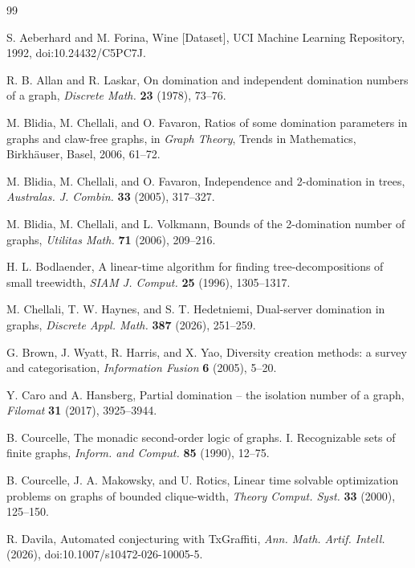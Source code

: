 \documentclass[11pt]{article}
\theoremstyle{definition}
\theoremstyle{remark}
\begin{document}
\begin{thebibliography}{99}

S. Aeberhard and M. Forina,
Wine [Dataset],
UCI Machine Learning Repository, 1992,
doi:10.24432/C5PC7J.

R. B. Allan and R. Laskar,
On domination and independent domination numbers of a graph,
\emph{Discrete Math.} \textbf{23} (1978), 73--76.

M. Blidia, M. Chellali, and O. Favaron,
Ratios of some domination parameters in graphs and claw-free graphs,
in \emph{Graph Theory}, Trends in Mathematics, Birkh\"auser, Basel, 2006,
61--72.

M. Blidia, M. Chellali, and O. Favaron,
Independence and 2-domination in trees,
\emph{Australas. J. Combin.} \textbf{33} (2005), 317--327.

M. Blidia, M. Chellali, and L. Volkmann,
Bounds of the 2-domination number of graphs,
\emph{Utilitas Math.} \textbf{71} (2006), 209--216.

H. L. Bodlaender,
A linear-time algorithm for finding tree-decompositions of small treewidth,
\emph{SIAM J. Comput.} \textbf{25} (1996), 1305--1317.

M. Chellali, T. W. Haynes, and S. T. Hedetniemi,
Dual-server domination in graphs,
\emph{Discrete Appl. Math.} \textbf{387} (2026), 251--259.

G. Brown, J. Wyatt, R. Harris, and X. Yao,
Diversity creation methods: a survey and categorisation,
\emph{Information Fusion} \textbf{6} (2005), 5--20.

Y. Caro and A. Hansberg,
Partial domination -- the isolation number of a graph,
\emph{Filomat} \textbf{31} (2017), 3925--3944.

B. Courcelle,
The monadic second-order logic of graphs. I. Recognizable sets of finite
graphs,
\emph{Inform. and Comput.} \textbf{85} (1990), 12--75.

B. Courcelle, J. A. Makowsky, and U. Rotics,
Linear time solvable optimization problems on graphs of bounded clique-width,
\emph{Theory Comput. Syst.} \textbf{33} (2000), 125--150.

R. Davila,
Automated conjecturing with TxGraffiti,
\emph{Ann. Math. Artif. Intell.} (2026), doi:10.1007/s10472-026-10005-5.


\end{thebibliography}
\end{document}

